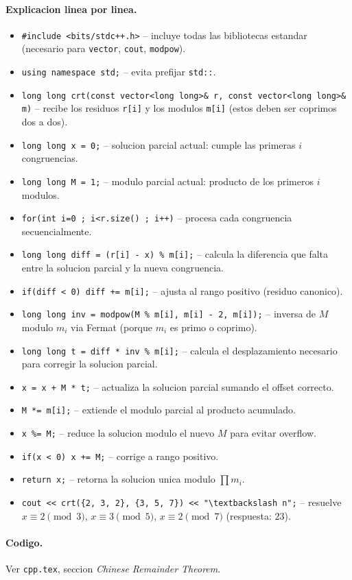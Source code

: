\paragraph{Explicacion linea por linea.}
\begin{itemize}\setlength\itemsep{0pt}
	\item \verb|#include <bits/stdc++.h>| -- incluye todas las bibliotecas estandar (necesario para \texttt{vector}, \texttt{cout}, \texttt{modpow}).
	\item \verb|using namespace std;| -- evita prefijar \verb|std::|.
	\item \verb|long long crt(const vector<long long>& r, const vector<long long>& m)| -- recibe los residuos \verb|r[i]| y los modulos \verb|m[i]| (estos deben ser coprimos dos a dos).
	\item \verb|long long x = 0;| -- solucion parcial actual: cumple las primeras $i$ congruencias.
	\item \verb|long long M = 1;| -- modulo parcial actual: producto de los primeros $i$ modulos.
	\item \verb|for(int i=0 ; i<r.size() ; i++)| -- procesa cada congruencia secuencialmente.
	\item \verb|long long diff = (r[i] - x) % m[i];| -- calcula la diferencia que falta entre la solucion parcial y la nueva congruencia.
	\item \verb|if(diff < 0) diff += m[i];| -- ajusta al rango positivo (residuo canonico).
	\item \verb|long long inv = modpow(M % m[i], m[i] - 2, m[i]);| -- inversa de $M$ modulo $m_i$ via Fermat (porque $m_i$ es primo o coprimo).
	\item \verb|long long t = diff * inv % m[i];| -- calcula el desplazamiento necesario para corregir la solucion parcial.
	\item \verb|x = x + M * t;| -- actualiza la solucion parcial sumando el offset correcto.
	\item \verb|M *= m[i];| -- extiende el modulo parcial al producto acumulado.
	\item \verb|x %= M;| -- reduce la solucion modulo el nuevo $M$ para evitar overflow.
	\item \verb|if(x < 0) x += M;| -- corrige a rango positivo.
	\item \verb|return x;| -- retorna la solucion unica modulo $\prod m_i$.
	\item \verb|cout << crt({2, 3, 2}, {3, 5, 7}) << "\textbackslash n";| -- resuelve $x \equiv 2 \pmod 3$, $x \equiv 3 \pmod 5$, $x \equiv 2 \pmod 7$ (respuesta: $23$).
\end{itemize}

\paragraph{Codigo.}
Ver \texttt{cpp.tex}, seccion \textit{Chinese Remainder Theorem}.

\vspace{0.5em}
